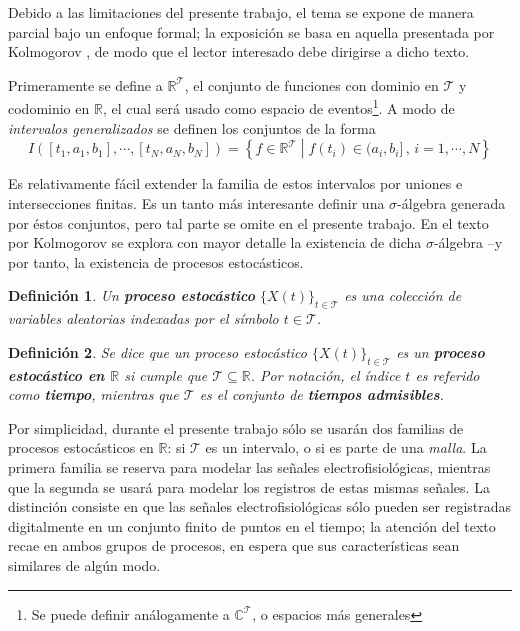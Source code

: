 \documentclass[12pt,letterpaper]{book}
\newtheorem{definicion}{Definición}[chapter]
\newcommand{\R}{\mathbb{R}}
\newcommand{\C}{\mathbb{C}}
\newcommand{\xt}{$\{X(t)\}_{t\in \mathcal{T}}$ }
\newcommand{\talque}{\mathrel{}\middle|\mathrel{}}
\begin{document}
Debido a las limitaciones del presente trabajo, el tema se expone de manera parcial bajo un enfoque formal; la exposición se basa en aquella presentada por Kolmogorov \cite{kolmogorov2018foundations},
 de modo que el lector interesado debe dirigirse a dicho texto.

Primeramente se define a $\R^{\mathcal{T}}$, el conjunto de funciones con dominio en $\mathcal{T}$ y codominio en $\R$, el cual será usado como espacio de eventos\footnote{Se puede definir análogamente a $\C^{\mathcal{T}}$, o espacios más generales}. 
%
A modo de \textit{intervalos generalizados} se definen los conjuntos de la forma
\begin{equation}
I\left( [t_1, a_1, b_1], \cdots, [t_N, a_N, b_N] \right) = 
\left\{ f \in \R^{\mathcal{T}} \talque f(t_i) \in (a_i, b_i] \, , \, i = 1, \cdots, N \right\}
\end{equation}

Es relativamente fácil extender la familia de estos intervalos por uniones e intersecciones finitas. Es un tanto más interesante definir una $\sigma$-álgebra generada por éstos conjuntos, pero tal parte se omite en el presente trabajo.
%
En el texto por Kolmogorov se explora con mayor detalle la existencia de dicha $\sigma$-álgebra --y por tanto, la existencia de procesos estocásticos.

\begin{definicion}
Un \textbf{proceso estocástico} \xt es una colección de variables aleatorias indexadas por el símbolo $t\in\mathcal{T}$.
\end{definicion}

\begin{definicion}
Se dice que un proceso estocástico \xt es un \textbf{proceso estocástico en $\R$} si cumple que $\mathcal{T} \subseteq \R$.
%
Por notación, el índice $t$ es referido como \textbf{tiempo}, mientras que $\mathcal{T}$ es el conjunto de \textbf{tiempos admisibles}.
\end{definicion}

Por simplicidad, durante el presente trabajo sólo se usarán dos familias de procesos estocásticos en $\R$: si $\mathcal{T}$ es un intervalo, o si es parte de una \textit{malla}. 
%
La primera familia se reserva para modelar las señales electrofisiológicas, mientras que la segunda se usará para modelar los registros de estas mismas señales.
%
La distinción consiste en que las señales electrofisiológicas sólo pueden ser registradas digitalmente en un conjunto finito de puntos en el tiempo; la atención del texto recae en ambos grupos de procesos, en espera que sus características sean similares de algún modo.
\end{document}
